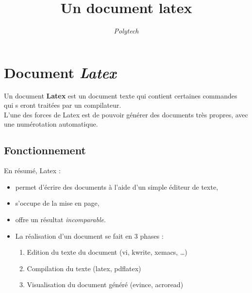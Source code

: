\title{Un document latex}
\author{\textit{Polytech}}
\date{}




\section{Document \textit{Latex}}

Un document \textbf{Latex} est un document texte qui contient certaines
commandes qui s
eront traitées par un compilateur. \\
L'une des forces de Latex est de pouvoir générer des documents très
propres,  avec une numérotation automatique.

\subsection{Fonctionnement}

En résumé, Latex :

\begin{itemize}
\item permet d'écrire des documents à l'aide d'un simple éditeur de texte,
\item s'occupe de la mise en page,
\item offre un résultat \textit{incomparable}. 
\item La réalisation d'un document se fait en 3 phases :
    \begin{enumerate}
    \item Edition du texte du document (vi, kwrite, xemacs, \ldots)
    \item Compilation du texte (latex, pdflatex)
    \item Visualisation du document généré (evince, acroread)
    \end{enumerate}
\end{itemize}



